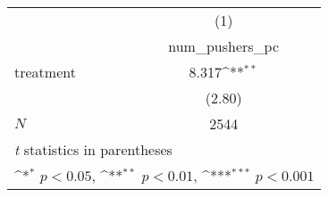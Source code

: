 {
\def\sym#1{\ifmmode^{#1}\else\(^{#1}\)\fi}
\begin{tabular}{l*{1}{c}}
\hline\hline
            &\multicolumn{1}{c}{(1)}\\
            &\multicolumn{1}{c}{num\_pushers\_pc}\\
\hline
treatment   &       8.317\sym{**} \\
            &      (2.80)         \\
\hline
\(N\)       &        2544         \\
\hline\hline
\multicolumn{2}{l}{\footnotesize \textit{t} statistics in parentheses}\\
\multicolumn{2}{l}{\footnotesize \sym{*} \(p<0.05\), \sym{**} \(p<0.01\), \sym{***} \(p<0.001\)}\\
\end{tabular}
}
